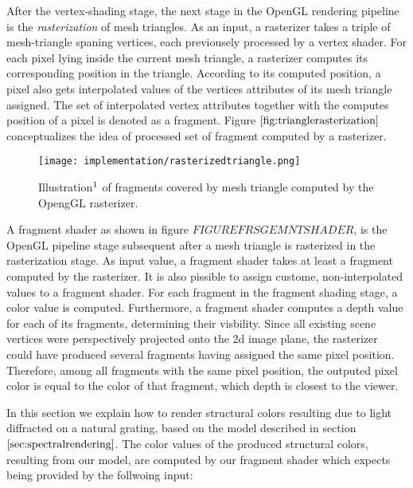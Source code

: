 After the vertex-shading stage, the next stage in the OpenGL rendering pipeline is the \emph{rasterization} of mesh triangles. As an input, a rasterizer takes a triple of mesh-triangle spaning vertices, each previousely processed by a vertex shader. For each pixel lying inside the current mesh triangle, a rasterizer computes its corresponding position in the triangle. According to its computed position, a pixel also gets interpolated values of the vertices attributes of its mesh triangle assigned. The set of interpolated vertex attributes together with the computes position of a pixel is denoted as a fragment. Figure $\ref{fig:trianglerasterization}$ conceptualizes the idea of processed set of fragment computed by a rasterizer.

\begin{figure}[H]
  \centering
  \texttt{[image: implementation/rasterizedtriangle.png]}
  \caption[Triangle Rasterization]{Illustration$\footnotemark$ of fragments covered by mesh triangle computed by the OpengGL rasterizer.}
  \label{fig:trianglerasterization}
\end{figure}

A fragment shader as shown in figure $FIGUREFRSGEMNTSHADER$, is the OpenGL pipeline stage subsequent after a mesh triangle is rasterized in the rasterization stage. As input value, a fragment shader takes at least a fragment computed by the rasterizer. It is also pissible to assign custome, non-interpolated values to a fragment shader. For each fragment in the fragment shading stage, a color value is computed. Furthermore, a fragment shader computes a depth value for each of its fragments, determining their visbility. Since all existing scene vertices were perspectively projected onto the 2d image plane, the rasterizer could have produced several fragments having assigned the same pixel position. Therefore, among all fragments with the same pixel position, the outputed pixel color is equal to the color of that fragment, which depth is closest to the viewer.


\label{sec:inputlists}
In this section we explain how to render structural colors resulting due to light diffracted on a natural grating, based on the model described in section $\ref{sec:spectralrendering}$. The color values of the produced structural colors, resulting from our model, are computed by our fragment shader which expects being provided by the follwoing input:

